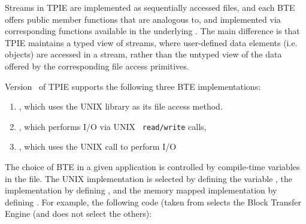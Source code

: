 
Streams in TPIE are implemented as sequentially accessed
files, and each BTE offers public member functions that are
analogous to, and implemented via corresponding functions
available in the underlying . The main
difference is that TPIE maintains a typed view of streams,
where user-defined data elements (i.e. objects) are accessed
in a stream, rather than the untyped view of the data
offered by the corresponding file
access primitives. 


Version \version~of TPIE supports the following three BTE
implementations:
\begin{enumerate}
    \item {}, which uses the
    UNIX  library as its file access method.
    
    \item {}, which performs I/O via UNIX {\tt
       read/write} calls,
    
    \item {}, which uses the UNIX
     call to perform I/O
\end{enumerate}

The choice of BTE in a given application is controlled by
compile-time variables in the  file.
The UNIX  implementation is selected by
defining the variable , the
 implementation by defining
, and the memory mapped implementation
by defining .  For example, the
following code (taken from  selects
the  Block Transfer Engine (and does not
select the others):

